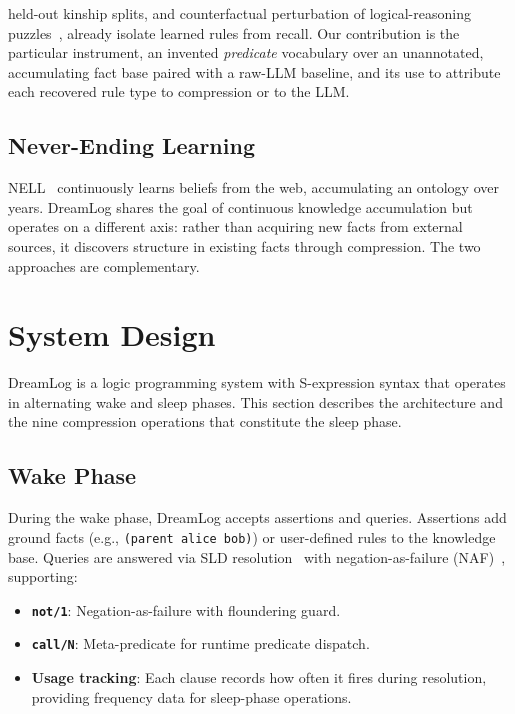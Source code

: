 \documentclass[10pt,conference]{IEEEtran}
\begin{document}
held-out kinship splits, and counterfactual perturbation of logical-reasoning puzzles~\cite{xie2024memorization}, already isolate learned rules from recall. Our contribution is the particular instrument, an invented \emph{predicate} vocabulary over an unannotated, accumulating fact base paired with a raw-LLM baseline, and its use to attribute each recovered rule type to compression or to the LLM.

\subsection{Never-Ending Learning}

NELL~\cite{mitchell2018never} continuously learns beliefs from the web, accumulating an ontology over years. DreamLog shares the goal of continuous knowledge accumulation but operates on a different axis: rather than acquiring new facts from external sources, it discovers structure in existing facts through compression. The two approaches are complementary.


\section{System Design}
\label{sec:system}

DreamLog is a logic programming system with S-expression syntax that operates in alternating wake and sleep phases. This section describes the architecture and the nine compression operations that constitute the sleep phase.

\subsection{Wake Phase}

During the wake phase, DreamLog accepts assertions and queries. Assertions add ground facts (e.g., \texttt{(parent alice bob)}) or user-defined rules to the knowledge base. Queries are answered via SLD resolution~\cite{lloyd1987foundations} with negation-as-failure (NAF)~\cite{clark1978negation}, supporting:

\begin{itemize}
\item \textbf{\texttt{not/1}}: Negation-as-failure with floundering guard.
\item \textbf{\texttt{call/N}}: Meta-predicate for runtime predicate dispatch.
\item \textbf{Usage tracking}: Each clause records how often it fires during resolution, providing frequency data for sleep-phase operations.
\end{itemize}
\end{document}
